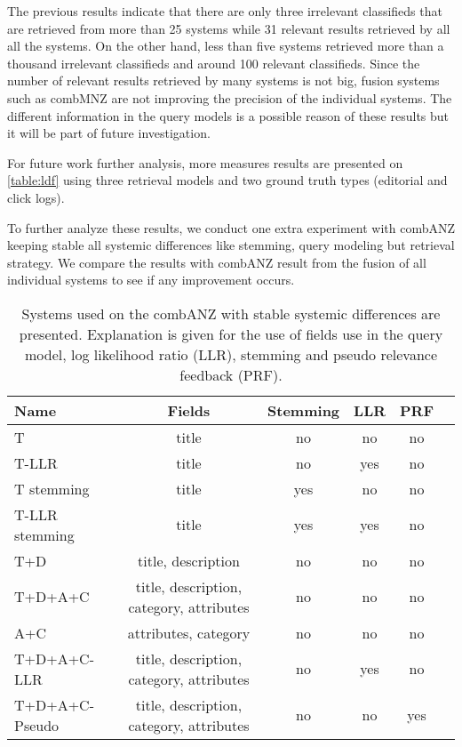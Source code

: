 The previous results indicate that there are only three irrelevant classifieds that are retrieved from more than 25 systems while 31 relevant results retrieved by all all the systems. On the other hand, less than five systems retrieved more than a thousand irrelevant classifieds and around 100 relevant classifieds.  Since the number of relevant results retrieved by many systems is not big, fusion systems such as combMNZ are not improving the precision of the individual systems. The different information in the query models is a possible reason of these results but it will be part of future investigation.


For future work further analysis, more measures results are presented on \ref{table:ldf} using three retrieval models and two ground truth types (editorial and click logs).

To further analyze these results, we conduct one extra experiment with combANZ keeping stable all systemic differences like stemming, query modeling but retrieval strategy. We compare the results with combANZ result from the fusion of all individual systems to see if any improvement occurs.



\begin{table}[H]
\begin{center}
\scriptsize
\caption{Systems used on the combANZ with stable systemic differences are presented. Explanation is given for the use of fields use in the query model, log likelihood ratio (LLR), stemming and pseudo relevance feedback (PRF). }
\begin{tabular}{lccccr}
\midrule
Name & Fields & Stemming & LLR & PRF \\
\midrule
T & title & no & no & no \\
T-LLR & title & no & yes & no \\
T stemming & title & yes & no & no \\
T-LLR stemming & title & yes & yes & no \\
T+D  & title, description & no & no & no \\
T+D+A+C & title, description, category, attributes & no & no & no \\
A+C & attributes, category & no & no & no \\
T+D+A+C-LLR & title, description, category, attributes & no & yes & no \\
T+D+A+C-Pseudo & title, description, category, attributes & no & no & yes \\
\bottomrule
\end{tabular}
\end{center}
\end{table}



